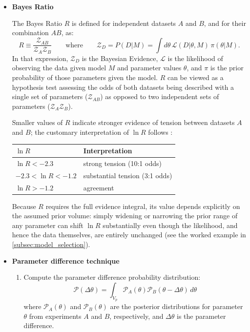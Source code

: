 \begin{itemize}
    \item \textbf{Bayes Ratio}
    
    The Bayes Ratio $R$ is defined for independent datasets $A$ and $B$, and for their combination $AB$, as:
    $$
    R \equiv \dfrac{\mathcal{Z}_{AB}}{\mathcal{Z}_{A}\mathcal{Z}_{B}}
    \qquad
    \text{where}
    \qquad
    \mathcal{Z}_{D} = P(D|M) = \int d\theta\, \mathcal{L}(D|\theta, M)\,\pi(\theta|M) .
    $$
    In that expression, $\mathcal{Z}_{D}$ is the Bayesian Evidence, $\mathcal{L}$ is the likelihood of observing the data given model $M$ and parameter values $\theta$, and $\pi$ is the prior probability of those parameters given the model. $R$ can be viewed as a hypothesis test assessing the odds of both datasets being described with a single set of parameters ($\mathcal{Z}_{AB}$) as opposed to two independent sets of parameters ($\mathcal{Z}_{A}\mathcal{Z}_{B}$).

    Smaller values of $R$ indicate stronger evidence of tension between datasets $A$ and $B$; the customary interpretation of $\ln R$ follows :
    \begin{center}
        \small
        \begin{tabular}{ll}
            \toprule
            \textbf{$\ln R$} & \textbf{Interpretation} \\
            \midrule
            $\ln R < -2.3$ & strong tension (10:1 odds) \\
            $-2.3 < \ln R < -1.2$ & substantial tension (3:1 odds) \\
            $\ln R > -1.2$ & agreement \\
            \bottomrule
        \end{tabular}
    \end{center}
    Because $R$ requires the full evidence integral, its value depends explicitly on the assumed prior volume: simply widening or narrowing the prior range of any parameter can shift $\ln R$ substantially even though the likelihood, and hence the data themselves, are entirely unchanged (see the worked example in \cref{subsec:model_selection}).

    \item \textbf{Parameter difference technique}
    
    \begin{enumerate}
        \item Compute the parameter difference probability distribution:
        $$
            \mathcal{P}(\Delta\theta) = \int_{V_p} \mathcal{P}_A(\theta) \mathcal{P}_B(\theta - \Delta\theta)\, d\theta
        $$
        where $\mathcal{P}_A(\theta)$ and $\mathcal{P}_B(\theta)$ are the posterior distributions for parameter $\theta$ from experiments $A$ and $B$, respectively, and $\Delta\theta$ is the parameter difference.


\end{enumerate}
\end{itemize}
